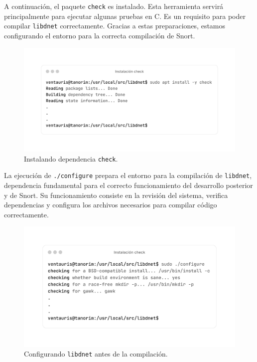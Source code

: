\documentclass[11pt,a4paper,twoside]{report}
\begin{document}
\newpage

A continuación, el paquete \texttt{check} es instalado. Esta herramienta servirá principalmente para ejecutar algunas pruebas en C. Es un requisito para poder compilar \texttt{libdnet} correctamente. Gracias a estas preparaciones, estamos configurando el entorno para la correcta compilación de Snort.

\begin{figure}[H]
	\centering
	\includegraphics[scale=0.12]{instalacion_snort/2-2.png}
	\caption{Instalando dependencia \texttt{check}.}
\end{figure}

La ejecución de \texttt{./configure} prepara el entorno para la compilación de \texttt{libdnet}, dependencia fundamental para el correcto funcionamiento del desarrollo posterior y de Snort. Su funcionamiento consiste en la revisión del sistema, verifica dependencias y configura los archivos necesarios para compilar código correctamente.

\begin{figure}[H]
	\centering
	\includegraphics[scale=0.12]{instalacion_snort/3-3.png}
	\caption{Configurando \texttt{libdnet} antes de la compilación.}
\end{figure}
\end{document}
